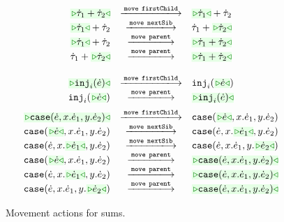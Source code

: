 \begin{figure}
\begin{displaymath}
\begin{array}{@{}rcl}
  \TABperformMove
      {\zwsel{\tsum{\htau_1}{\htau_2}}}
      {\aMove{\dChild}}
      {      {\tsum{\zwsel{\htau_1}}{\htau_2}}}
  \\
  \TABperformMove
      {      {\tsum{\zwsel{\htau_1}}{\htau_2}}}
      {\aMove{\dNext}}
      {      {\tsum{{\htau_1}}{\zwsel{\htau_2}}}}
  \\
  \TABperformMove
      {      {\tsum{\zwsel{\htau_1}}{\htau_2}}}
      {\aMove{\dParent}}
      {\zwsel{\tsum{{\htau_1}}{{\htau_2}}}}
  \\
  \TABperformMove
      {      {\tsum{{\htau_1}}{{\zwsel{\htau_2}}}}}
      {\aMove{\dParent}}
      {\zwsel{\tsum{{\htau_1}}{\htau_2}}}
  \\[2mm]
\end{array}
\end{displaymath}
\begin{displaymath}
\begin{array}{@{}rcl}
  \TABperformMove
      {\zwsel{\hinj{i}{\hexp}}}
      {\aMove{\dChild}}
      {\hinj{i}{\zwsel{\hexp}}}
  \\
  \TABperformMove
      {\hinj{i}{\zwsel{\hexp}}}
      {\aMove{\dParent}}
      {\zwsel{\hinj{i}{\hexp}}}
  \\[2mm]
  \TABperformMove
      {\zwsel{\hcase{\hexp}{x}{\hexp_1}{y}{\hexp_2}}}
      {\aMove{\dChild}}
      {      {\hcase{\zwsel{\hexp}}{x}{\hexp_1}{y}{\hexp_2}}}
  \\
  \TABperformMove
      {      {\hcase{\zwsel{\hexp}}{x}{\hexp_1}{y}{\hexp_2}}}
      {\aMove{\dNext}}
      {      {\hcase{{\hexp}}{x}{\zwsel{\hexp_1}}{y}{\hexp_2}}}
  \\
  \TABperformMove
      {      {\hcase{{\hexp}}{x}{\zwsel{\hexp_1}}{y}{\hexp_2}}}
      {\aMove{\dNext}}
      {      {\hcase{{\hexp}}{x}{{\hexp_1}}{y}{\zwsel{\hexp_2}}}}
  \\
  \TABperformMove
      {      {\hcase{\zwsel{\hexp}}{x}{\hexp_1}{y}{\hexp_2}}}
      {\aMove{\dParent}}
      {\zwsel{\hcase{{\hexp}}{x}{\hexp_1}{y}{\hexp_2}}}
  \\
  \TABperformMove
      {      {\hcase{{\hexp}}{x}{\zwsel{\hexp_1}}{y}{\hexp_2}}}
      {\aMove{\dParent}}
      {\zwsel{\hcase{{\hexp}}{x}{\hexp_1}{y}{\hexp_2}}}
  \\
  \TABperformMove
      {      {\hcase{{\hexp}}{x}{\hexp_1}{y}{\zwsel{\hexp_2}}}}
      {\aMove{\dParent}}
      {\zwsel{\hcase{{\hexp}}{x}{\hexp_1}{y}{\hexp_2}}}
\end{array}
\end{displaymath}
\caption{Movement actions for sums.}
\label{fig:sum-move}
\end{figure}

